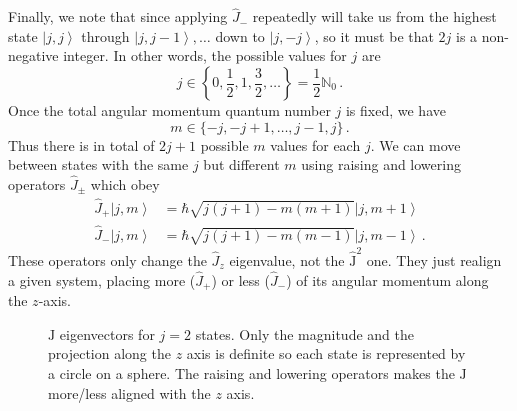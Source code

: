 \documentclass{article}
\theoremstyle{plain}\theoremheaderfont{\normalfont\itshape}\theorembodyfont{\rmfamily}\theoremseparator{.}\newtheorem*{rem}{Remark}\newtheorem*{ex}{Example}\newtheorem*{proof}{Proof}\newtheorem*{altp}{Alternative proof}
\theoremstyle{plain}\theoremheaderfont{\normalfont\bfseries}\theorembodyfont{\rmfamily}\theoremseparator{.}\newtheorem{thm}{Theorem}[section]\newtheorem{lem}[thm]{Lemma}\newtheorem{prop}[thm]{Proposition}\newtheorem*{cor}{Corollary}\newtheorem{defn}[thm]{Definition}\newtheorem{clm}[thm]{Claim}\newtheorem{clminproof}{Claim}
\theoremstyle{break}\theoremheaderfont{\normalfont\itshape}\theorembodyfont{\rmfamily}\theoremseparator{.\medskip}\newtheorem*{proofskip}{Proof}\newtheorem*{exs}{Examples}\newtheorem*{rems}{Remarks}
\theoremstyle{break}\theoremheaderfont{\normalfont\bfseries}\theorembodyfont{\rmfamily}\theoremseparator{.\medskip}\newtheorem{lemskip}[thm]{Lemma}\newtheorem{defnskip}[thm]{Definition}\newtheorem{propskip}[thm]{Proposition}\newtheorem{thmskip}[thm]{Theorem}
\numberwithin{equation}{section}
\newcommand{\ket}[1]{\left| #1 \right\rangle}
\newcommand{\vb}[1]{\bm{\mathrm{#1}}}
\newcommand{\NN}{\mathbb{N}}
\begin{document}
    Finally, we note that since applying \(\hat{J}_-\) repeatedly will take us from the highest state \(\ket{j,j}\) through \(\ket{j,j-1},\dots\) down to \(\ket{j,-j}\), so it must be that \(2j\) is a non-negative integer. In other words, the possible values for \(j\) are
    \begin{equation}
        j\in\left\{0,\frac{1}{2},1,\frac{3}{2},\dots\right\}=\frac{1}{2}\NN_0\,.
    \end{equation}
    Once the total angular momentum quantum number \(j\) is fixed, we have
    \begin{equation}
        m\in\{-j,-j+1,\dots,j-1,j\}\,.
    \end{equation}
    Thus there is in total of \(2j+1\) possible \(m\) values for each \(j\). We can move between states with the same \(j\) but different \(m\) using raising and lowering operators \(\hat{J}_\pm\) which obey
    \begin{align}
        \hat{J}_+\ket{j,m}&=\hbar\sqrt{j(j+1)-m(m+1)}\ket{j,m+1}\label{ang_momentum_raising}\\
        \hat{J}_-\ket{j,m}&=\hbar\sqrt{j(j+1)-m(m-1)}\ket{j,m-1}\label{ang_momentum_lowering}\,.
    \end{align}
    These operators only change the \(\hat{J}_z\) eigenvalue, not the \(\hat{\vb{J}}^2\) one. They just realign a given system, placing more (\(\hat{J}_+\)) or less (\(\hat{J}_-\)) of its angular momentum along the \(z\)-axis.

    \begin{figure}
        \centering
        \caption{\(\vb{J}\) eigenvectors for \(j=2\) states. Only the magnitude and the projection along the \(z\) axis is definite so each state is represented by a circle on a sphere. The raising and lowering operators makes the \(\vb{J}\) more/less aligned with the \(z\) axis.}
    \end{figure}
\end{document}
